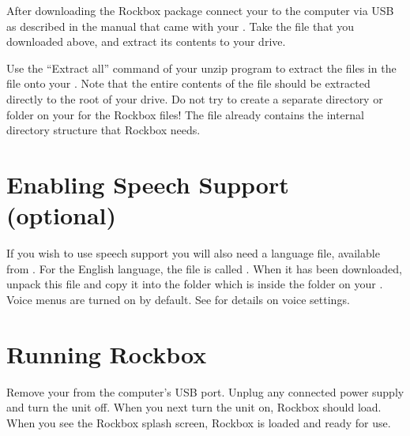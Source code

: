 After downloading the Rockbox package connect your \dap{} to the computer via 
USB as described in the manual that came with your \dap{}. Take the file that 
you downloaded above, and extract its contents to your \daps{} drive.

Use the ``Extract all'' command of your unzip program to extract the files in 
the  file onto your \dap{}. Note that the entire contents of the 
 file should be extracted directly to the root of your \daps{} 
drive.  Do not try to create a separate directory or folder on your \dap{} for 
the Rockbox files!  The  file already contains the internal 
directory structure that Rockbox needs. 


\section{Enabling Speech Support (optional)}\label{sec:enabling_speech_support} 
If you wish to use speech support you will also need a language file, available
from .  For the English language, the file is called
. When it has been downloaded, unpack this file and copy it
into the  folder which is inside the  folder on
your \dap{}. Voice menus are turned on by default. See
 for details on voice settings.

\section{Running Rockbox} 
Remove your \dap{} from the computer's USB port. Unplug any connected power supply
and turn the unit off. When you next turn the unit on, Rockbox should load. When
you see the Rockbox splash screen, Rockbox is loaded and ready for use.


